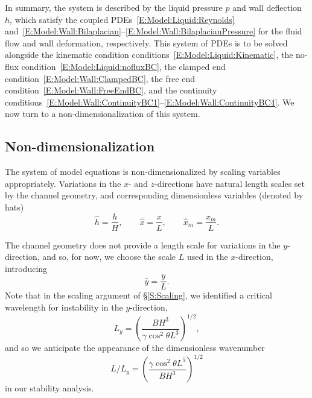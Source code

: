 \documentclass{jfm}
\begin{document}
In summary, the system is described by the liquid pressure $p$ and wall deflection $h$, which satisfy the coupled PDEs~\eqref{E:Model:Liquid:Reynolds} and~\eqref{E:Model:Wall:Bilaplacian}--\eqref{E:Model:Wall:BilaplacianPressure} for the fluid flow and wall deformation, respectively. This system of PDEs is to be solved alongside the kinematic condition conditions~\eqref{E:Model:Liquid:Kinematic}, the no-flux condition~\eqref{E:Model:Liquid:nofluxBC}, the clamped end condition~\eqref{E:Model:Wall:ClampedBC}, the free end condition~\eqref{E:Model:Wall:FreeEndBC}, and the continuity conditions~\eqref{E:Model:Wall:ContinuityBC1}--\eqref{E:Model:Wall:ContinuityBC4}. We now turn to a non-dimensionalization of this system.


\subsection{Non-dimensionalization}\label{S:Modelling:NonDim}
The system of model equations is non-dimensionalized by scaling variables appropriately. Variations in the $x$- and $z$-directions have natural length scales set by the channel geometry, and corresponding dimensionless variables (denoted by hats)
\begin{equation}\label{E:Modelling:NonDim:SpatialScaling}
\hat{h} = \frac{h}{H}, \qquad \hat{x} = \frac{x}{L}, \qquad \hat{x}_m = \frac{x_m}{L}.
\end{equation}

The channel geometry does not provide a length scale for variations in the $y$-direction, and so, for now, we choose the scale $L$ used in the $x$-direction, introducing
\begin{equation}\label{E:Modelling:NonDim:yscaling}
\hat{y} = \frac{y}{L}.
\end{equation}
Note that in the scaling argument of \S\ref{S:Scaling}, we identified a critical wavelength for instability in the $y$-direction,
\begin{equation}\label{E:Modelling:NonDim:LengthscaleFromScaling}
L_y = \left(\frac{B H^3}{\gamma  \cos^2 \theta L^3}\right)^{1/2},
\end{equation}
and so we anticipate the appearance of the dimensionless wavenumber
\begin{equation}\label{E:Modelling:NonDim:ExpectedWavenumber}
L/L_y =  \left(\frac{\gamma \cos^2 \theta L^5}{B H^3}\right)^{1/2}
\end{equation}
in our stability analysis.
\end{document}
